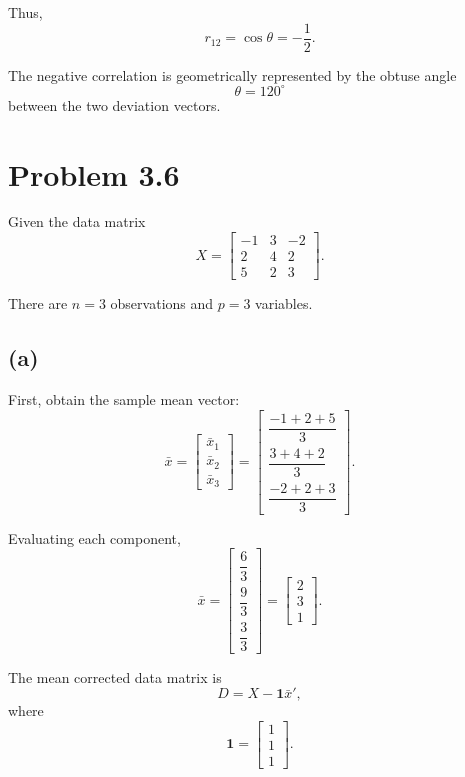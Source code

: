 \documentclass[12pt]{article}
\begin{document}
	Thus,
	\[
	\boxed{r_{12}=\cos\theta=-\frac12}.
	\]
	
	The negative correlation is geometrically represented by the
	obtuse angle
	\[
	\boxed{\theta=120^\circ}
	\]
	between the two deviation vectors.
	
	\section*{Problem 3.6}
	
	Given the data matrix
	\[
	X=
	\begin{bmatrix}
		-1&3&-2\\
		2&4&2\\
		5&2&3
	\end{bmatrix}.
	\]
	
	There are \(n=3\) observations and \(p=3\) variables.
	
	\subsection*{(a)}
	
	First, obtain the sample mean vector:
	\[
	\bar{x}
	=
	\begin{bmatrix}
		\bar{x}_1\\
		\bar{x}_2\\
		\bar{x}_3
	\end{bmatrix}
	=
	\begin{bmatrix}
		\dfrac{-1+2+5}{3}\\[8pt]
		\dfrac{3+4+2}{3}\\[8pt]
		\dfrac{-2+2+3}{3}
	\end{bmatrix}.
	\]
	
	Evaluating each component,
	\[
	\bar{x}
	=
	\begin{bmatrix}
		\dfrac{6}{3}\\[4pt]
		\dfrac{9}{3}\\[4pt]
		\dfrac{3}{3}
	\end{bmatrix}
	=
	\boxed{
		\begin{bmatrix}
			2\\
			3\\
			1
	\end{bmatrix}}.
	\]
	
	The mean corrected data matrix is
	\[
	D=X-\mathbf{1}\bar{x}',
	\]
	where
	\[
	\mathbf{1}
	=
	\begin{bmatrix}
		1\\1\\1
	\end{bmatrix}.
	\]
	
\end{document}
